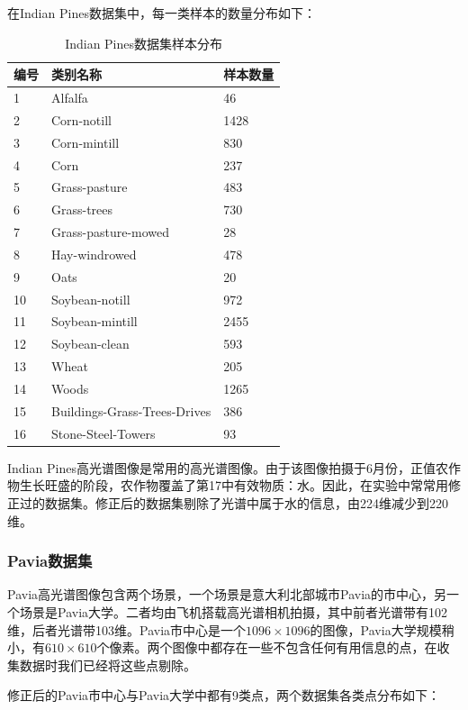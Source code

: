 \documentclass[12pt,a4paper]{article}
\begin{document}
在Indian Pines数据集中，每一类样本的数量分布如下：
\begin{table}[h]
\centering
\caption{Indian Pines数据集样本分布}\label{tab:IP}
\begin{tabu} to 1\textwidth{X[c]X[10,c]X[3,c]}
\hline
编号 & 类别名称 & 样本数量\\
 & Alfalfa & 46 \\
2 & Corn-notill & 1428 \\
3 & Corn-mintill & 830 \\
4 & Corn & 237 \\
5 & Grass-pasture & 483 \\
6 & Grass-trees & 730 \\
7 & Grass-pasture-mowed & 28 \\
8 & Hay-windrowed & 478 \\
9 & Oats & 20 \\
10 & Soybean-notill & 972 \\
11 & Soybean-mintill & 2455 \\
12 & Soybean-clean & 593 \\
13 & Wheat & 205 \\
14 & Woods & 1265 \\
15 & Buildings-Grass-Trees-Drives & 386 \\
16 & Stone-Steel-Towers & 93\\
\hline
\end{tabu}
\end{table}

Indian Pines高光谱图像是常用的高光谱图像。由于该图像拍摄于6月份，正值农作物生长旺盛的阶段，农作物覆盖了第17中有效物质：水。因此，在实验中常常用修正过的数据集。修正后的数据集剔除了光谱中属于水的信息，由224维减少到220维。

\subsubsection{Pavia数据集}
Pavia高光谱图像包含两个场景，一个场景是意大利北部城市Pavia的市中心，另一个场景是Pavia大学。二者均由飞机搭载高光谱相机拍摄，其中前者光谱带有102维，后者光谱带103维。Pavia市中心是一个$1096 \times 1096$的图像，Pavia大学规模稍小，有$610 \times 610$个像素。两个图像中都存在一些不包含任何有用信息的点，在收集数据时我们已经将这些点剔除。

修正后的Pavia市中心与Pavia大学中都有9类点，两个数据集各类点分布如下：
\end{document}
